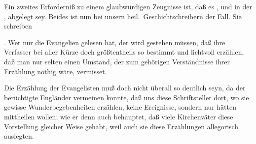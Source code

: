 Ein zweites Erforderniß zu einem glaubwürdigen Zeugnisse ist, daß es , und in der , abgelegt sey. Beides ist nun bei unsern heil.\ Geschichtschreibern der Fall. Sie schreiben~
\begin{aufza}
\item {}. Wer nur die Evangelien gelesen hat, der wird gestehen müssen, daß ihre Verfasser bei aller Kürze doch größtentheils so bestimmt und lichtvoll erzählen, daß man nur selten einen Umstand, der zum gehörigen Verständnisse ihrer Erzählung nöthig wäre, vermisset.
\item[\RWbet{Einwurf.}] Die Erzählung der Evangelisten muß doch nicht überall so deutlich seyn, da der berüchtigte Engländer  vermeinen konnte, daß uns diese Schriftsteller dort, wo sie gewisse Wunderbegebenheiten erzählen, keine Ereignisse, sondern nur  hätten mittheilen wollen; wie er denn auch behauptet, daß viele Kirchenväter diese Vorstellung gleicher Weise gehabt, weil auch sie diese Erzählungen allegorisch auslegten.

\end{aufza}
